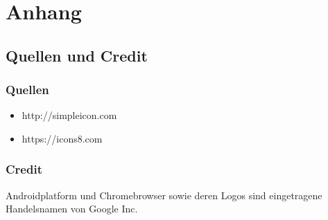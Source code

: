 \documentclass[pflichtenheft.tex]{subfiles}
\begin{document}
\chapter{Anhang}

\section{Quellen und Credit}
\subsection{Quellen}
\begin{itemize}
  \item http://simpleicon.com
  \item https://icons8.com
\end{itemize}
\subsection{Credit}
Android\texttrademark platform und Chrome\texttrademark browser sowie deren Logos sind eingetragene Handelsnamen von Google Inc.



\begin{versionhistory}
\renewcommand \vhAuthorColWidth{1.2\hsize}
\renewcommand \vhChangeColWidth{0.4\hsize}
\end{versionhistory}
\end{document}
